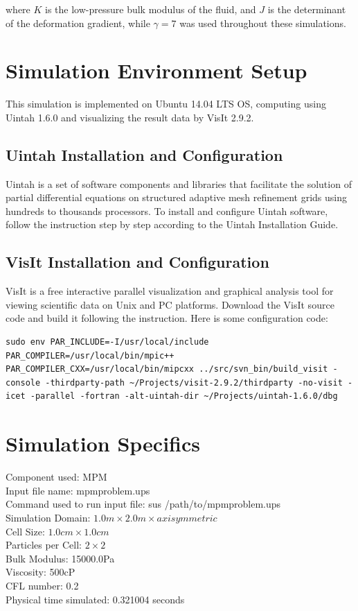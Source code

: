\documentclass[a4paper, 11pt]{article}
\begin{document}
\noindent
where $K$ is the low-pressure bulk modulus of the fluid, and $J$ is the determinant of the deformation gradient, while $\gamma=7$ was used throughout these simulations.

\section{Simulation Environment Setup}
This simulation is implemented on Ubuntu 14.04 LTS OS, computing using Uintah 1.6.0 and visualizing the result data by VisIt 2.9.2.

\subsection{Uintah Installation and Configuration}
Uintah is a set of software components and libraries that facilitate the solution of partial differential equations on structured adaptive mesh refinement grids using hundreds to thousands processors\cite{uintahwiki}. To install and configure Uintah software, follow the instruction step by step according to the Uintah Installation Guide\cite{uintahinstallation}.

\subsection{VisIt Installation and Configuration}
VisIt is a free interactive parallel visualization and graphical analysis tool for viewing scientific data on Unix and PC platforms\cite{visitwiki}. Download the VisIt source code and build it following the instruction\cite{visitbuild}. Here is some configuration code:

\begin{lstlisting}[frame=shadowbox,breaklines=true,basicstyle=\ttfamily\small]
sudo env PAR_INCLUDE=-I/usr/local/include PAR_COMPILER=/usr/local/bin/mpic++ PAR_COMPILER_CXX=/usr/local/bin/mipcxx ../src/svn_bin/build_visit -console -thirdparty-path ~/Projects/visit-2.9.2/thirdparty -no-visit -icet -parallel -fortran -alt-uintah-dir ~/Projects/uintah-1.6.0/dbg
\end{lstlisting}

\section{Simulation Specifics}
Component used: MPM\\
Input file name: mpmproblem.ups\\
Command used to run input file: sus /path/to/mpmproblem.ups\\
Simulation Domain: $1.0m \times 2.0m \times axisymmetric$\\
Cell Size: $1.0cm \times 1.0cm$\\
Particles per Cell: $2 \times 2$\\
Bulk Modulus: 15000.0Pa\\
Viscosity: 500cP\\
CFL number: 0.2\\
Physical time simulated: 0.321004 seconds
\end{document}
